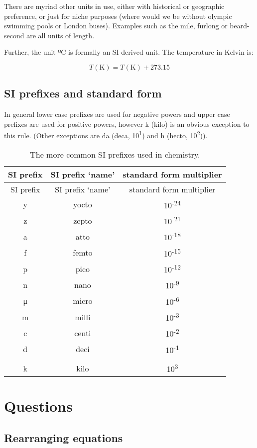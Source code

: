 \documentclass[
]{book}
\begin{document}
There are myriad other units in use, either with historical or geographic preference, or just for niche purposes (where would we be without olympic swimming pools or London buses). Examples such as the mile, furlong or beard-second are all units of length.

Further, the unit ºC is formally an SI derived unit. The temperature in Kelvin is:

\begin{equation*}
T (\textrm{K}) = T (\textrm{K}) + 273.15
\end{equation*}

\hypertarget{si-prefixes-and-standard-form}{%
\subsection{SI prefixes and standard form}\label{si-prefixes-and-standard-form}}

In general lower case prefixes are used for negative powers and upper case prefixes are used for positive powers, however k (kilo) is an obvious exception to this rule. (Other exceptions are da (deca, 10\textsuperscript{1}) and h (hecto, 10\textsuperscript{2})).

\begin{longtable}[]{@{}ccc@{}}
\caption{\label{tab:SIprefix} The more common SI prefixes used in chemistry.}\tabularnewline
\toprule
SI prefix & SI prefix `name' & standard form multiplier\tabularnewline
\midrule
\endfirsthead
\toprule
SI prefix & SI prefix `name' & standard form multiplier\tabularnewline
\midrule
\endhead
y & yocto & 10\textsuperscript{-24}\tabularnewline
z & zepto & 10\textsuperscript{-21}\tabularnewline
a & atto & 10\textsuperscript{-18}\tabularnewline
f & femto & 10\textsuperscript{-15}\tabularnewline
p & pico & 10\textsuperscript{-12}\tabularnewline
n & nano & 10\textsuperscript{-9}\tabularnewline
μ & micro & 10\textsuperscript{-6}\tabularnewline
m & milli & 10\textsuperscript{-3}\tabularnewline
c & centi & 10\textsuperscript{-2}\tabularnewline
d & deci & 10\textsuperscript{-1}\tabularnewline
& &\tabularnewline
k & kilo & 10\textsuperscript{3}\tabularnewline
\bottomrule
\end{longtable}

\hypertarget{sec:Questions}{%
\section{Questions}\label{sec:Questions}}

\hypertarget{subsec:rearrange}{%
\subsection{Rearranging equations}\label{subsec:rearrange}}
\end{document}

